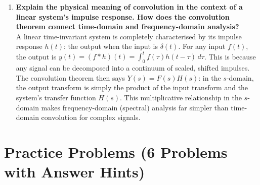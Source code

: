 \documentclass[12pt,a4paper]{article}
\begin{document}
\begin{enumerate}[label=\textbf{\arabic*.}, leftmargin=*, itemsep=10pt]
\item \textbf{Explain the physical meaning of convolution in the context of a linear system's impulse response. How does the convolution theorem connect time-domain and frequency-domain analysis?}\\
A linear time-invariant system is completely characterised by its impulse response $h(t)$:
the output when the input is $\delta(t)$.
For any input $f(t)$, the output is $y(t)=(f*h)(t)=\int_0^t f(\tau)h(t-\tau)\,d\tau$.
This is because any signal can be decomposed into a continuum of scaled, shifted impulses.
The convolution theorem then says $Y(s)=F(s)H(s)$: in the $s$-domain, the output transform
is simply the product of the input transform and the system's transfer function $H(s)$.
This multiplicative relationship in the $s$-domain makes frequency-domain (spectral) analysis
far simpler than time-domain convolution for complex signals.

\end{enumerate}

\section{Practice Problems (6 Problems with Answer Hints)}
\end{document}
